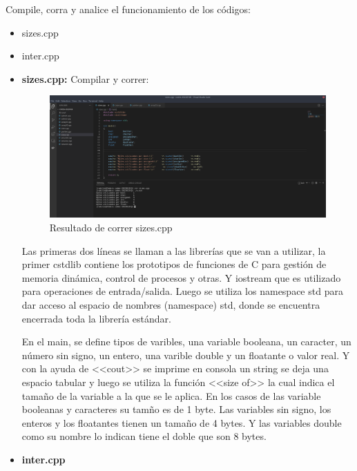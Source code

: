 \documentclass[11pt]{article}
\begin{document}
	\begin{problem}
		Compile, corra y analice el funcionamiento de los códigos:

			\begin{itemize}
				\item sizes.cpp
				\item inter.cpp
			\end{itemize}
		
	\end{problem}
	
	\begin{itemize}
		\item \textbf{sizes.cpp:}
		\subitem Compilar y correr:
		
		\begin{figure}[H]
			\centering
			\includegraphics[width=0.7\linewidth]{img1.png}
			\caption{Resultado de  correr sizes.cpp}
			\label{fig:img1}
		\end{figure}
		
		
	\subitem	Las primeras dos líneas se llaman a las librerías que se van a utilizar, la primer cstdlib  contiene los prototipos de funciones de C para gestión de memoria dinámica, control de procesos y otras. Y iostream que es utilizado para operaciones de entrada/salida. Luego se utiliza los namespace std para dar acceso al espacio de nombres (namespace) std, donde se encuentra encerrada toda la librería estándar.
	
	En el main, se define tipos de varibles, una variable booleana, un caracter, un número sin signo, un entero, una varible double y un floatante o valor real. Y con la ayuda de  <<cout>> se imprime en consola un string se deja una espacio tabular y luego se utiliza la función <<size of>> la cual indica el tamaño de la variable a la que se le aplica. En los casos de las variable booleanas y caracteres su tamño es de 1 byte. Las variables sin signo, los enteros y los floatantes tienen un tamaño de 4 bytes. Y las variables double como su nombre lo indican tiene el doble que son 8 bytes.
		
		
		
		\item \textbf{inter.cpp}
		

\end{itemize}
\end{document}
